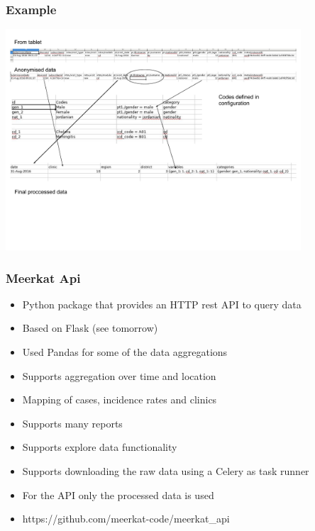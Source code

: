 \documentclass{beamer}
\begin{document}
\begin{frame}
   \frametitle{Example}
  \begin{center}
    \includegraphics[width=11cm]{ex.pdf}
  \end{center}

\end{frame}



\begin{frame}
    \frametitle{Meerkat Api}
    \begin{itemize}
    \item Python package that provides an HTTP rest API to query data
    \item Based on Flask (see tomorrow)
    \item Used Pandas for some of the data aggregations
    \item Supports aggregation over time and location
    \item Mapping of cases, incidence rates and clinics
    \item Supports many reports
    \item Supports explore data functionality
    \item Supports downloading the raw data using a Celery as task runner
    \item For the API only the processed data is used
    \item https://github.com/meerkat-code/meerkat\_api
    \end{itemize}
\end{frame}
\end{document}
